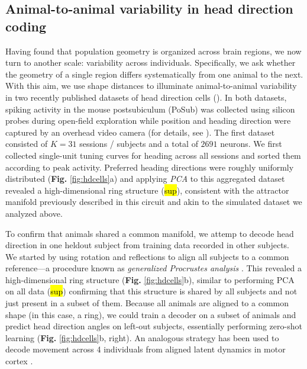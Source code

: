 \subsection{Animal-to-animal variability in head direction coding}

Having found that population geometry is organized across brain regions, we now turn to another scale: variability across individuals. Specifically, we ask whether the geometry of a single region differs systematically from one animal to the next. With this aim, we use shape distances to illuminate animal-to-animal variability in two recently published datasets of head direction cells (\cite{duszkiewicz}).
In both datasets, spiking activity in the mouse postsubiculum (PoSub) was collected using silicon probes during open-field exploration while position and heading direction were captured by an overhead video camera (for details, see \cite{duszkiewicz}).
The first dataset consisted of $K = 31$ sessions / subjects and a total of $2691$ neurons.
We first collected single-unit tuning curves for heading across all sessions and sorted them according to peak activity.
Preferred heading directions were roughly uniformly distributed (\textbf{Fig.} \ref{fig:hdcells}a) and applying \textit{PCA} to this aggregated dataset revealed a high-dimensional ring structure (\hl{sup}), consistent with the attractor manifold previously described in this circuit \parencite{chaudhuri2019intrinsic} and akin to the simulated dataset we analyzed above. 

To confirm that animals shared a common manifold, we attemp to decode head direction in one heldout subject from training data recorded in other subjects.
We started by using rotation and reflections to align all subjects to a common reference---a procedure known as \textit{generalized Procrustes analysis} \parencite{gower1975generalized}.
This revealed a high-dimensional ring structure (\textbf{Fig.} \ref{fig:hdcells}b), similar to performing PCA on all data (\hl{sup}) confirming that this structure is shared by all subjects and not just present in a subset of them. Because all animals are aligned to a common shape (in this case, a ring), we could train a decoder on a subset of animals and predict head direction angles on left-out subjects, essentially performing zero-shot learning (\textbf{Fig.} \ref{fig:hdcells}b, right). An analogous strategy has been used to decode movement across 4 individuals from aligned latent dynamics in motor cortex \parencite{safaie2023preserved}. 

